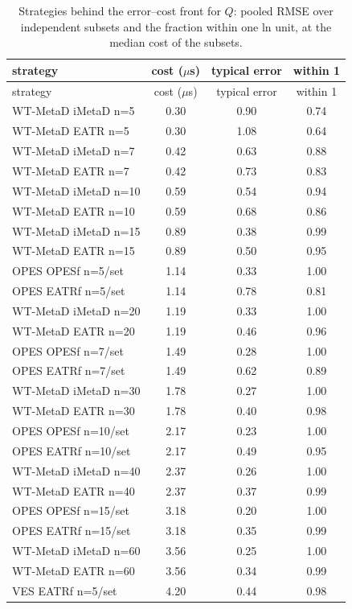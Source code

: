 \begin{longtable}{lccc}
\caption{Strategies behind the error--cost front for $Q$: pooled RMSE over independent subsets and the fraction within one ln unit, at the median cost of the subsets.}\label{tab:s10Q}\\
\toprule
strategy & cost ($\mu$s) & typical error & within 1\\ \midrule
\endfirsthead
\toprule
strategy & cost ($\mu$s) & typical error & within 1\\ \midrule
\endhead
\bottomrule
\endfoot
WT-MetaD iMetaD n=5 & 0.30 & 0.90 & 0.74 \\
WT-MetaD EATR n=5 & 0.30 & 1.08 & 0.64 \\
WT-MetaD iMetaD n=7 & 0.42 & 0.63 & 0.88 \\
WT-MetaD EATR n=7 & 0.42 & 0.73 & 0.83 \\
WT-MetaD iMetaD n=10 & 0.59 & 0.54 & 0.94 \\
WT-MetaD EATR n=10 & 0.59 & 0.68 & 0.86 \\
WT-MetaD iMetaD n=15 & 0.89 & 0.38 & 0.99 \\
WT-MetaD EATR n=15 & 0.89 & 0.50 & 0.95 \\
OPES OPESf n=5/set & 1.14 & 0.33 & 1.00 \\
OPES EATRf n=5/set & 1.14 & 0.78 & 0.81 \\
WT-MetaD iMetaD n=20 & 1.19 & 0.33 & 1.00 \\
WT-MetaD EATR n=20 & 1.19 & 0.46 & 0.96 \\
OPES OPESf n=7/set & 1.49 & 0.28 & 1.00 \\
OPES EATRf n=7/set & 1.49 & 0.62 & 0.89 \\
WT-MetaD iMetaD n=30 & 1.78 & 0.27 & 1.00 \\
WT-MetaD EATR n=30 & 1.78 & 0.40 & 0.98 \\
OPES OPESf n=10/set & 2.17 & 0.23 & 1.00 \\
OPES EATRf n=10/set & 2.17 & 0.49 & 0.95 \\
WT-MetaD iMetaD n=40 & 2.37 & 0.26 & 1.00 \\
WT-MetaD EATR n=40 & 2.37 & 0.37 & 0.99 \\
OPES OPESf n=15/set & 3.18 & 0.20 & 1.00 \\
OPES EATRf n=15/set & 3.18 & 0.35 & 0.99 \\
WT-MetaD iMetaD n=60 & 3.56 & 0.25 & 1.00 \\
WT-MetaD EATR n=60 & 3.56 & 0.34 & 0.99 \\
VES EATRf n=5/set & 4.20 & 0.44 & 0.98 \\

\end{longtable}
